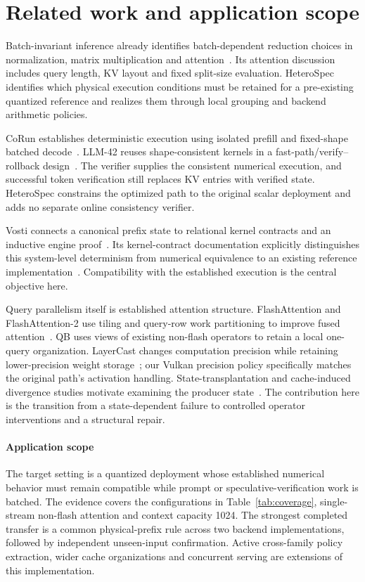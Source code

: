 \section{Related work and application scope}
\label{sec:related}
Batch-invariant inference already identifies batch-dependent reduction choices in normalization, matrix multiplication and attention~\cite{thinkingmachines}. Its attention discussion includes query length, KV layout and fixed split-size evaluation. HeteroSpec identifies which physical execution conditions must be retained for a pre-existing quantized reference and realizes them through local grouping and backend arithmetic policies.

CoRun establishes deterministic execution using isolated prefill and fixed-shape batched decode~\cite{corun}. LLM-42 reuses shape-consistent kernels in a fast-path/verify--rollback design~\cite{llm42}. The verifier supplies the consistent numerical execution, and successful token verification still replaces KV entries with verified state. HeteroSpec constrains the optimized path to the original scalar deployment and adds no separate online consistency verifier.

Vosti connects a canonical prefix state to relational kernel contracts and an inductive engine proof~\cite{vosti}. Its kernel-contract documentation explicitly distinguishes this system-level determinism from numerical equivalence to an existing reference implementation~\cite{vosticontract}. Compatibility with the established execution is the central objective here.

Query parallelism itself is established attention structure. FlashAttention and FlashAttention-2 use tiling and query-row work partitioning to improve fused attention~\cite{flashattention,flashattention2}. QB uses views of existing non-flash operators to retain a local one-query organization. LayerCast changes computation precision while retaining lower-precision weight storage~\cite{layercast}; our Vulkan precision policy specifically matches the original path's activation handling. State-transplantation and cache-induced divergence studies motivate examining the producer state~\cite{stagereplay,cachestate}. The contribution here is the transition from a state-dependent failure to controlled operator interventions and a structural repair.

\paragraph{Application scope}
The target setting is a quantized deployment whose established numerical behavior must remain compatible while prompt or speculative-verification work is batched. The evidence covers the configurations in Table~\ref{tab:coverage}, single-stream non-flash attention and context capacity 1024. The strongest completed transfer is a common physical-prefix rule across two backend implementations, followed by independent unseen-input confirmation. Active cross-family policy extraction, wider cache organizations and concurrent serving are extensions of this implementation.
